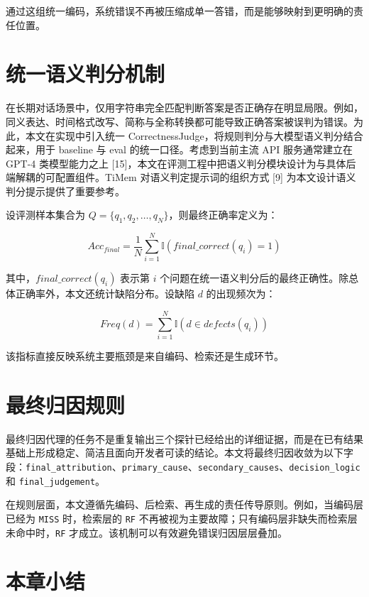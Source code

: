 通过这组统一编码，系统错误不再被压缩成单一答错，而是能够映射到更明确的责任位置。

\section{统一语义判分机制}

在长期对话场景中，仅用字符串完全匹配判断答案是否正确存在明显局限。例如，同义表达、时间格式改写、简称与全称转换都可能导致正确答案被误判为错误。为此，本文在实现中引入统一 CorrectnessJudge，将规则判分与大模型语义判分结合起来，用于 baseline 与 eval 的统一口径。考虑到当前主流 API 服务通常建立在 GPT-4 类模型能力之上 [15]，本文在评测工程中把语义判分模块设计为与具体后端解耦的可配置组件。TiMem 对语义判定提示词的组织方式 [9] 为本文设计语义判分提示提供了重要参考。

设评测样本集合为 $Q=\{q_1,q_2,\ldots,q_N\}$，则最终正确率定义为：

\begin{equation}
Acc_{final}=\frac{1}{N}\sum_{i=1}^{N}\mathbb{I}(final\_correct(q_i)=1)
\end{equation}

其中，$final\_correct(q_i)$ 表示第 $i$ 个问题在统一语义判分后的最终正确性。除总体正确率外，本文还统计缺陷分布。设缺陷 $d$ 的出现频次为：

\begin{equation}
Freq(d)=\sum_{i=1}^{N}\mathbb{I}(d \in defects(q_i))
\end{equation}

该指标直接反映系统主要瓶颈是来自编码、检索还是生成环节。

\section{最终归因规则}

最终归因代理的任务不是重复输出三个探针已经给出的详细证据，而是在已有结果基础上形成稳定、简洁且面向开发者可读的结论。本文将最终归因收敛为以下字段：\texttt{final\_attribution}、\texttt{primary\_cause}、\texttt{secondary\_causes}、\texttt{decision\_logic} 和 \texttt{final\_judgement}。

在规则层面，本文遵循先编码、后检索、再生成的责任传导原则。例如，当编码层已经为 \texttt{MISS} 时，检索层的 \texttt{RF} 不再被视为主要故障；只有编码层非缺失而检索层未命中时，\texttt{RF} 才成立。该机制可以有效避免错误归因层层叠加。

\section{本章小结}

